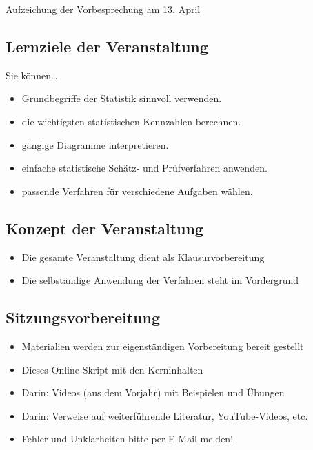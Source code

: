 \documentclass[
  11pt,
  ngerman,
  a4paper,
]{report}
\providecommand{\tightlist}{%
  \setlength{\itemsep}{0pt}\setlength{\parskip}{0pt}}
\begin{document}
\href{https://video01.uni-frankfurt.de/Mediasite/Play/c5c5115e37f948d0bfeb9610d18427661d}{Aufzeichung der Vorbesprechung am 13. April}

\hypertarget{lernziele-der-veranstaltung}{%
\subsection*{Lernziele der Veranstaltung}\label{lernziele-der-veranstaltung}}

Sie können\ldots{}

\begin{itemize}
\tightlist
\item
  Grundbegriffe der Statistik sinnvoll verwenden.
\item
  die wichtigsten statistischen Kennzahlen berechnen.
\item
  gängige Diagramme interpretieren.
\item
  einfache statistische Schätz- und Prüfverfahren anwenden.
\item
  passende Verfahren für verschiedene Aufgaben wählen.
\end{itemize}

\hypertarget{konzept-der-veranstaltung}{%
\subsection*{Konzept der Veranstaltung}\label{konzept-der-veranstaltung}}

\begin{itemize}
\tightlist
\item
  Die gesamte Veranstaltung dient als Klausurvorbereitung
\item
  Die selbständige Anwendung der Verfahren steht im Vordergrund
\end{itemize}

\hypertarget{sitzungsvorbereitung}{%
\subsection*{Sitzungsvorbereitung}\label{sitzungsvorbereitung}}

\begin{itemize}
\tightlist
\item
  Materialien werden zur eigenständigen Vorbereitung bereit gestellt
\item
  Dieses Online-Skript mit den Kerninhalten
\item
  Darin: Videos (aus dem Vorjahr) mit Beispielen und Übungen
\item
  Darin: Verweise auf weiterführende Literatur, YouTube-Videos, etc.
\item
  Fehler und Unklarheiten bitte per E-Mail melden!
\end{itemize}
\end{document}
